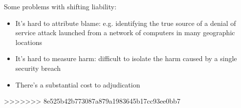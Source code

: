 Some problems with shifting liability:
	\begin{itemize}
		\item It's hard to attribute blame: e.g. identifying the true source of a denial of service attack launched from a network of computers in many geographic locations
		\item It's hard to measure harm: difficult to isolate the harm caused by a single security breach
		\item There's a substantial cost to adjudication
	\end{itemize}
>>>>>>> 8e525b42b773087a879a1983645b17cc93ee0bb7

